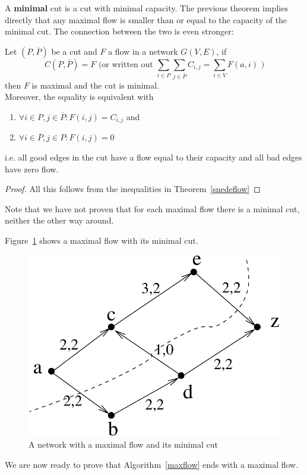 A \textbf{minimal} cut is a cut with minimal capacity. The previous
theorem implies directly that any maximal flow is smaller than or
equal to the capacity of the minimal cut. The connection between the
two is even stronger:


 \begin{theorem}
  Let $(P,\overline{P})$ be a cut and $F$ a flow in a network $G(V,E)$,
if
\[C(P,\overline{P})=F\mbox{ \ \ (or written out }
\sum_{i \in P} \sum_{j \in \overline{P}} C_{i,j} = \sum_{i \in V} F(a,i)
 \mbox{ )}\]
 then $F$ is maximal and the cut is minimal.\\
  Moreover, the equality is equivalent with
\begin{enumerate}
\item
$\forall i \in P, j \in \overline{P}: F(i,j) = C_{i,j}$ and
\item
$\forall i \in \overline{P}, j \in P: F(i,j) = 0$
\end{enumerate}
i.e. all good edges in the cut have a flow equal to their capacity and
all bad edges have zero flow.
\end{theorem}
\begin{proof}
All this follows from the inequalities in Theorem~\ref{snedeflow}
\end{proof}

Note that we have not proven that for each maximal flow there is a
minimal cut, neither the other way around.



Figure~\ref{snede2} shows a maximal flow with its minimal cut.

\begin{figure}[ht]
\begin{center}
\includegraphics[width=0.35\linewidth,keepaspectratio]{snede2} %
\end{center}
\caption{A network with a maximal flow and its minimal cut\label{snede2}}
\end{figure}

We are now ready to prove that Algorithm~\ref{maxflow} ends with a
maximal flow.



